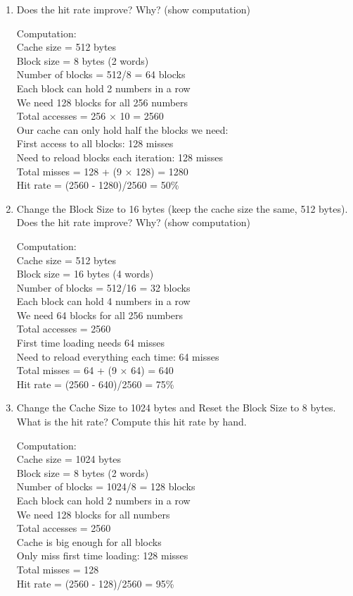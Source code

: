 \documentclass{article}\\
\begin{document}
\begin{enumerate}
    \item Does the hit rate improve? Why? (show computation)
    
    Computation:\\
    Cache size = 512 bytes\\
    Block size = 8 bytes (2 words)\\
    Number of blocks = 512/8 = 64 blocks\\
    Each block can hold 2 numbers in a row\\
    We need 128 blocks for all 256 numbers\\
    Total accesses = 256 × 10 = 2560\\
    Our cache can only hold half the blocks we need:\\
    First access to all blocks: 128 misses\\
    Need to reload blocks each iteration: 128 misses\\
    Total misses = 128 + (9 × 128) = 1280\\
    Hit rate = (2560 - 1280)/2560 = 50\%

    \item Change the Block Size to 16 bytes (keep the cache size the same, 512 bytes). Does the hit rate improve? Why? (show computation)
    
    Computation:\\
    Cache size = 512 bytes\\
    Block size = 16 bytes (4 words)\\
    Number of blocks = 512/16 = 32 blocks\\
    Each block can hold 4 numbers in a row\\
    We need 64 blocks for all 256 numbers\\
    Total accesses = 2560\\
    First time loading needs 64 misses\\
    Need to reload everything each time: 64 misses\\
    Total misses = 64 + (9 × 64) = 640\\
    Hit rate = (2560 - 640)/2560 = 75\%

    \item Change the Cache Size to 1024 bytes and Reset the Block Size to 8 bytes. What is the hit rate? Compute this hit rate by hand.
    
    Computation:\\
    Cache size = 1024 bytes\\
    Block size = 8 bytes (2 words)\\
    Number of blocks = 1024/8 = 128 blocks\\
    Each block can hold 2 numbers in a row\\
    We need 128 blocks for all numbers\\
    Total accesses = 2560\\
    Cache is big enough for all blocks\\
    Only miss first time loading: 128 misses\\
    Total misses = 128\\
    Hit rate = (2560 - 128)/2560 = 95\%


\end{enumerate}
\end{document}
